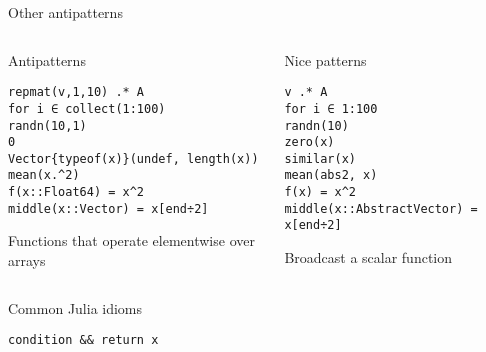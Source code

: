 \begin{frame}[fragile]{Other antipatterns}{}
    \begin{columns}
        \begin{column}{0.5\textwidth}
            \begin{block}{Antipatterns}
        \begin{verbatim}
repmat(v,1,10) .* A
for i ∈ collect(1:100)
randn(10,1)
0
Vector{typeof(x)}(undef, length(x))
mean(x.^2)
f(x::Float64) = x^2
middle(x::Vector) = x[end÷2]
        \end{verbatim}
        Functions that operate elementwise over arrays
    \end{block}
    \end{column}

    \begin{column}{0.5\textwidth}
        \begin{block}{Nice patterns}
    \begin{verbatim}
v .* A
for i ∈ 1:100
randn(10)
zero(x)
similar(x)
mean(abs2, x)
f(x) = x^2
middle(x::AbstractVector) = x[end÷2]
    \end{verbatim}
    Broadcast a scalar function
\end{block}
\end{column}
\end{columns}

\end{frame}



\begin{frame}[fragile]{Common Julia idioms}{}
    \begin{verbatim}
condition && return x
    \end{verbatim}



\end{frame}

